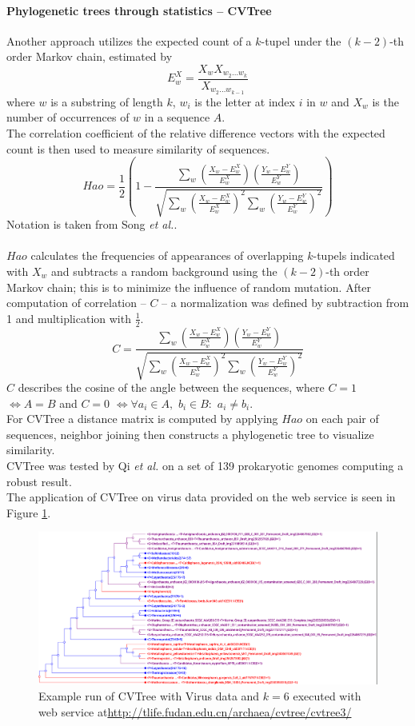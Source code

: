 \documentclass[twocolumn]{bmcart}%
\begin{document}
\paragraph*{Phylogenetic trees through statistics -- CVTree}
Another approach utilizes the expected count of a $k$-tupel under the $(k-2)$-th order Markov chain, estimated by 
$$E_w^X=\frac{X_wX_{w_2\dots w_k}}{X_{w_2\dots w_{k-1}}}$$
where $w$ is a substring of length $k$, $w_i$ is the letter at index $i$ in $w$ and $X_w$ is the number of occurrences of $w$ in a sequence $A$.\\
The correlation coefficient of the relative difference vectors with the expected count is then used to measure similarity of sequences.
$$Hao=\frac{1}{2}\left(1-\frac{\sum_w\left(\frac{X_w-E_w^X}{E_w^X}\right)\left(\frac{Y_w-E_w^Y}{E_w^Y}\right)}{\sqrt{\sum_w\left(\frac{X_w-E_w^X}{E_w^X}\right)^2\sum_w\left(\frac{Y_w-E_w^Y}{E_w^Y}\right)^2}}\right)$$
Notation is taken from Song \textit{et al.}\cite{doi:10.1093/bib/bbt067}.\\
\\
$Hao$ calculates the frequencies of appearances of overlapping $k$-tupels indicated with $X_w$ and subtracts a random background using the $(k-2)$-th order Markov chain; this is to minimize the influence of random mutation. After computation of correlation -- $C$ -- a normalization was defined by subtraction from 1 and multiplication with $\frac{1}{2} $.
$$C=\frac{\sum_w\left(\frac{X_w-E_w^X}{E_w^X}\right)\left(\frac{Y_w-E_w^Y}{E_w^Y}\right)}{\sqrt{\sum_w\left(\frac{X_w-E_w^X}{E_w^X}\right)^2\sum_w\left(\frac{Y_w-E_w^Y}{E_w^Y}\right)^2}}$$
$C$ describes the cosine of the angle between the sequences, where $C=1$ $\Leftrightarrow A=B$ and $C=0$ $\Leftrightarrow \forall a_i \in A,$ $b_i \in B:$ $a_i \neq b_i$. \\
For CVTree a distance matrix is computed by applying $Hao$ on each pair of sequences, neighbor joining then constructs a phylogenetic tree to visualize similarity.\\
CVTree was tested by Qi \textit{et al.} on a set of 139 prokaryotic genomes computing a robust result\cite{qi2004cvtree}. \\
The application of CVTree on virus data provided on the web service is seen in Figure \ref{img:cvtree}.
\begin{figure}
	\centering
	\includegraphics[width=.99\textwidth]{bilder/CVTree.png}
	\caption{Example run of CVTree with Virus data and $k=6$ executed with web service at\newline \url{http://tlife.fudan.edu.cn/archaea/cvtree/cvtree3/} \cite{qi2004whole,zuo2015cvtree3}}
	\label{img:cvtree}
\end{figure}%
\end{document}
